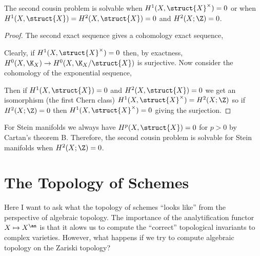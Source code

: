 \documentclass[12pt]{article}
\begin{document}
\begin{theorem}
The second cousin problem is solvable when $H^1(X, \struct{X}^\times) = 0$ or when $H^1(X, \struct{X}) = H^2(X, \struct{X}) = 0$ and $H^2(X; \Z) = 0$.
\end{theorem}

\begin{proof}
The second exact sequence gives a cohomology exact sequence,
\begin{center}
\end{center}
Clearly, if $H^1(X, \struct{X}^\times) = 0$ then, by exactness, $H^0(X, \K_X) \to H^0(X, \K_X / \struct{X})$ is surjective. Now consider the cohomology of the exponential sequence,
\begin{center}
\end{center}
Then if $H^1(X, \struct{X}) = 0$ and $H^2(X, \struct{X}) = 0$ we get an isomorphism (the first Chern class) $H^1(X, \struct{X}^\times) = H^2(X; \Z)$ so if $H^2(X; \Z) = 0$ then $H^1(X, \struct{X}^\times) = 0$ giving the surjection. 
\end{proof}

\begin{rmk}
For Stein manifolds we always have $H^p(X, \struct{X}) = 0$ for $p > 0$ by Cartan's theorem B. Therefore, the second cousin problem is solvable for Stein manifolds when $H^2(X; \Z) = 0$. 
\end{rmk}

\section{The Topology of Schemes}

Here I want to ask what the topology of schemes ``looks like'' from the perspective of algebraic topology. The importance of the analytification functor $X \mapsto X^\an$ is that it alows us to compute the ``correct'' topological invariants to complex varieties. However, what happens if we try to compute algebraic topology on the Zariski topology?
\end{document}
